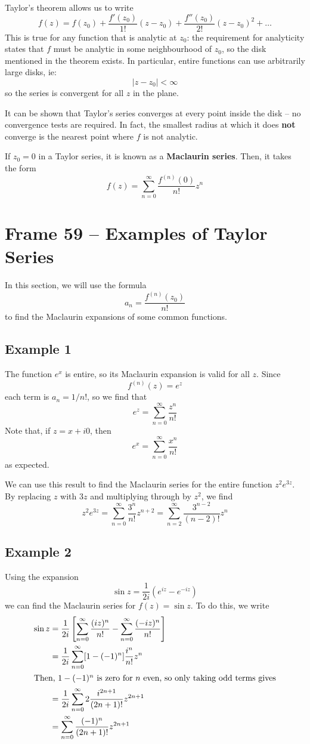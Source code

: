 \documentclass{article}
\renewcommand{\emph}{\textbf}
\begin{document}
Taylor's theorem allows us to write
\[
	f(z) = f(z_0) 
	+ \frac{f'(z_0)}{1!}  (z - z_0)
	+ \frac{f''(z_0)}{2!} (z - z_0)^2
	+ \dots 
\]
This is true for any function that is analytic at $z_0$: the requirement for analyticity states that $f$ must be analytic in some neighbourhood of $z_0$, so the disk mentioned in the theorem exists. In particular, entire functions can use arbitrarily large disks, ie:
\[
	|z - z_0| < \infty
\]
so the series is convergent for all $z$ in the plane.

It can be shown that Taylor's series converges at every point inside the disk -- no convergence tests are required. In fact, the smallest radius at which it does \emph{not} converge is the nearest point where $f$ is not analytic. 

If $z_0 = 0$ in a Taylor series, it is known as a \emph{Maclaurin series}. Then, it takes the form
\[
	f(z) = \sum_{n=0}^\infty \frac{f^{(n)}(0)}{n!} z^n
\]


\clearpage
\section{Frame 59 -- Examples of Taylor Series}
In this section, we will use the formula
\[
	a_n = \frac{f^{(n)}(z_0)}{n!}
\]
to find the Maclaurin expansions of some common functions.

\subsection{Example 1}
The function $e^x$ is entire, so its Maclaurin expansion is valid for all $z$. Since
\[
	f^{(n)}(z) = e^z
\]
each term is $a_n = 1/n!$, so we find that
\[
	e^z = \sum_{n=0}^\infty \frac{z^n}{n!}
\]
Note that, if $z = x + i0$, then
\[
	e^x = \sum_{n=0}^\infty \frac{x^n}{n!}
\]
as expected.

We can use this result to find the Maclaurin series for the entire function $z^2 e^{3z}$. By replacing $z$ with $3z$ and multiplying through by $z^2$, we find
\[
	z^2 e^{3z} = \sum_{n=0}^\infty \frac{3^n}{n!} z^{n+2} 
	= \sum_{n=2}^\infty \frac{3^{n-2}}{(n-2)!} z^n
\]

\subsection{Example 2}
Using the expansion
\[
	\sin z = \frac{1}{2i} (e^{iz} - e^{-iz})
\]
we can find the Maclaurin series for $f(z) = \sin z$. To do this, we write
\begin{align*}
	\sin z 
	&= \frac{1}{2i} \left[ \sum_{n=0}^\infty \frac{(iz)^n}{n!} - \sum_{n=0}^\infty \frac{(-iz)^n}{n!}  \right] \\
	&= \frac{1}{2i} \sum_{n=0}^\infty [1 - (-1)^n] \frac{i^n}{n!} z^n \\
\intertext{Then, $1 - (-1)^n$ is zero for $n$ even, so only taking odd terms gives}
	&= \frac{1}{2i} \sum_{n=0}^\infty 2 \frac{i^{2n+1}}{(2n+1)!} z^{2n+1} \\
	&= \sum_{n=0}^\infty \frac{(-1)^n}{(2n + 1)!} z^{2n + 1}
\end{align*}
\end{document}

